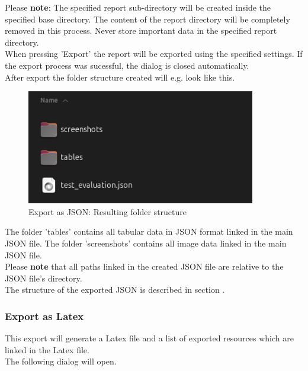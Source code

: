Please \textbf{note}: The specified report sub-directory will be created inside the specified base directory.
The content of the report directory will be completely removed in this process.
Never store important data in the specified report directory. \\

When pressing 'Export' the report will be exported using the specified settings.
If the export process was sucessful, the dialog is closed automatically. \\

After export the folder structure created will e.g. look like this.

\begin{figure}[H]
    \hspace*{-2.5cm}
    \center
    \includegraphics[width=10cm,frame]{figures/export_json_result.png}
  \caption{Export as JSON: Resulting folder structure}
\end{figure}

The folder 'tables' contains all tabular data in JSON format linked in the main JSON file.
The folder 'screenshots' contains all image data linked in the main JSON file. \\

Please \textbf{note} that all paths linked in the created JSON file are relative to the 
JSON file's directory. \\

The structure of the exported JSON is described in section .

\subsubsection{Export as Latex}
\label{sec:report_export_latex}

This export will generate a Latex file and a list of exported resources which are linked in the Latex file. \\

The following dialog will open.

